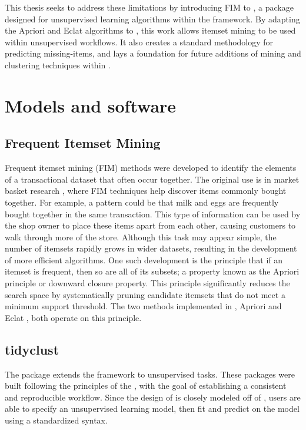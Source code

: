 \documentclass[
  article]{jss}
\begin{document}
This thesis seeks to address these limitations by introducing FIM to
 \citep{hvitfeldt_tidyclust_2022}, a package designed for
unsupervised learning algorithms within the  framework.
By adapting the Apriori and Eclat algorithms to , this
work allows itemset mining to be used within unsupervised workflows. It
also creates a standard methodology for predicting missing-items, and
lays a foundation for future additions of mining and clustering
techniques within .

\section{Models and software}\label{sec-models}

\subsection{Frequent Itemset Mining}\label{frequent-itemset-mining}

Frequent itemset mining (FIM) methods were developed to identify the
elements of a transactional dataset that often occur together. The
original use is in market basket research \citep{agrawal_mining_1993},
where FIM techniques help discover items commonly bought together. For
example, a pattern could be that milk and eggs are frequently bought
together in the same transaction. This type of information can be used
by the shop owner to place these items apart from each other, causing
customers to walk through more of the store. Although this task may
appear simple, the number of itemsets rapidly grows in wider datasets,
resulting in the development of more efficient algorithms. One such
development is the principle that if an itemset is frequent, then so are
all of its subsets; a property known as the Apriori principle or
downward closure property. This principle significantly reduces the
search space by systematically pruning candidate itemsets that do not
meet a minimum support threshold. The two methods implemented in
, Apriori \citep{agrawal_mining_1993} and Eclat
\citep{zaki_scalable_2000}, both operate on this principle.

\subsection{tidyclust}\label{tidyclust}

The  package \citep{hvitfeldt_tidyclust_2022} extends the
 \citep{kuhn_tidymodels_2020} framework to unsupervised
tasks. These packages were built following the principles of the
 \citep{wickham_welcome_2019}, with the goal of
establishing a consistent and reproducible workflow. Since the design of
 is closely modeled off of 
\citep{kuhn_parsnip_2024}, users are able to specify an unsupervised
learning model, then fit and predict on the model using a standardized
syntax.
\end{document}
